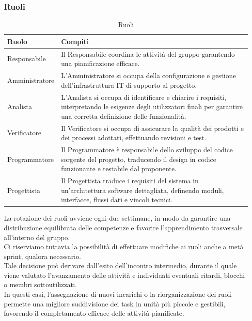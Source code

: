 \subsubsection{Ruoli}
\begin{table}[H]
\centering
\renewcommand{\arraystretch}{1.15}
\begin{tabular}{ |p{}|p{}|}
    \hline
    \textbf{Ruolo} & \textbf{Compiti} \\
    \hline
    Responsabile & Il Responsabile coordina le attività del gruppo garantendo una pianificazione efficace. \\
    \hline
    Amministratore & L’Amministratore si occupa della configurazione e gestione dell’infrastruttura IT di supporto al progetto. \\
    \hline
    Analista & L’Analista si occupa di identificare e chiarire i requisiti, interpretando le esigenze degli utilizzatori finali per garantire una corretta definizione delle funzionalità. \\
    \hline
    Verificatore & Il Verificatore si occupa di assicurare la qualità dei prodotti e dei processi adottati, effettuando revisioni e test. \\
    \hline
    Programmatore & Il Programmatore è responsabile dello sviluppo del codice sorgente del progetto, traducendo il design in codice funzionante e testabile dal proponente. \\
    \hline
    Progettista & Il Progettista traduce i requisiti del sistema in un’architettura software dettagliata, definendo moduli, interfacce, flussi dati e vincoli tecnici. \\
    \hline
\end{tabular}
\caption{Ruoli}
\end{table}

La rotazione dei ruoli avviene ogni due settimane, in modo da garantire una distribuzione equilibrata delle competenze e favorire l’apprendimento trasversale all’interno del gruppo.\\
Ci riserviamo tuttavia la possibilità di effettuare modifiche ai ruoli anche a metà sprint, qualora necessario.\\
Tale decisione può derivare dall’esito dell’incontro intermedio, durante il quale viene valutato l’avanzamento delle attività e individuati eventuali ritardi, blocchi o membri sottoutilizzati.\\
In questi casi, l’assegnazione di nuovi incarichi o la riorganizzazione dei ruoli permette una migliore suddivisione dei task in unità più piccole e gestibili, favorendo il completamento efficace delle attività pianificate.

